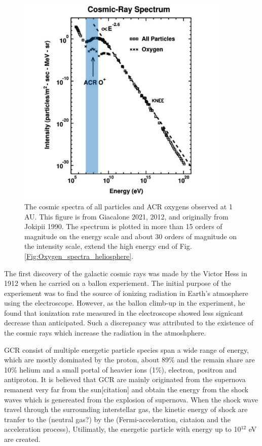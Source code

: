 \begin{figure}
	\centering
	\includegraphics[width = 0.9\textwidth]{images/gcr_spectra_shadow.png}
	
	\caption{The cosmic spectra of all particles and ACR oxygens observed at 1 AU. This figure is from Giacalone 2021, 2012, and originally from Jokipii 1990.
	The spectrum is plotted in more than 15 orders of magnitude on the energy scale and about 30 orders of magnitude on the intensity scale, extend the high energy end of Fig.\ref{Fig:Oxygen_spectra_heliosphere}.}
	\label{Fig:Oxygen_spectra_cosmic_ray}
\end{figure}
The first discovery of the galactic cosmic rays was made by the Victor Hess in 1912 when he carried on a ballon experiement. The initial purpose of the experiement was to find the source of ionizing radiation in Earth's atmosphere using the electroscope. However, as the ballon climb-up in the experiment, he found that ionization rate measured in the electroscope showed less signicant decrease than anticipated. Such a discrepancy was attributed to the existence of the cosmic rays which increase the radiation in the atmoshphere.

\acs{GCR} consist of multiple energetic particle species span a wide range of energy, which are mostly dominated by the proton, about 89\%  and the remain share are 10\% helium and a small portal of heavier ions (1\%), electron, positron and antiproton. 
It is believed that \acs{GCR} are mainly originated from the supernova remanent very far from the sun[citation] and obtain the energy from the shock waves which is genereated from the explosion of supernova. When the shock wave travel through the surrounding interstellar gas, the kinetic energy of shock are tranfer to the  (neutral gas?) by the (Fermi-acceleration, ciataion and the acceleration process), Utilimatly, the energetic particle with energy up to 10$^12$ eV are created.

